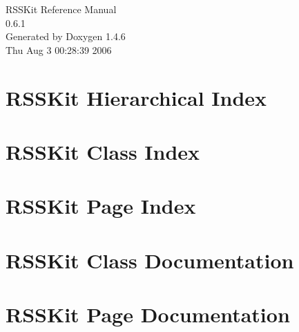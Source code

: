 \documentclass[a4paper]{book}
\begin{document}
\begin{titlepage}
\vspace*{7cm}
\begin{center}
{\Large RSSKit Reference Manual\\[1ex]\large 0.6.1 }\\
\vspace*{1cm}
{\large Generated by Doxygen 1.4.6}\\
\vspace*{0.5cm}
{\small Thu Aug 3 00:28:39 2006}\\
\end{center}
\end{titlepage}
\clearemptydoublepage
{}
\tableofcontents
\clearemptydoublepage
{}
\chapter{RSSKit Hierarchical Index}

\chapter{RSSKit Class Index}

\chapter{RSSKit Page Index}

\chapter{RSSKit Class Documentation}





\chapter{RSSKit Page Documentation}

\printindex
\end{document}
